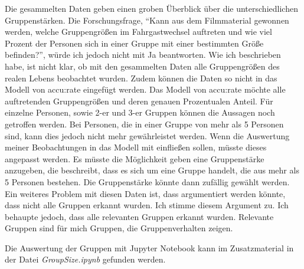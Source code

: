 Die gesammelten Daten geben einen groben Überblick über die unterschiedlichen Gruppenstärken. Die Forschungsfrage, "`Kann aus dem Filmmaterial gewonnen werden, welche Gruppengrößen im Fahrgastwechsel auftreten und wie viel Prozent der Personen sich in einer Gruppe mit einer bestimmten Größe befinden?"', würde ich jedoch nicht mit Ja beantworten. Wie ich beschrieben habe, ist nicht klar, ob mit den gesammelten Daten alle Gruppengrößen des realen Lebens beobachtet wurden. Zudem können die Daten so nicht in das Modell von accu:rate eingefügt werden. Das Modell von accu:rate möchte alle auftretenden Gruppengrößen und deren genauen Prozentualen Anteil. Für einzelne Personen, sowie 2-er und 3-er Gruppen können die Aussagen noch getroffen werden. Bei Personen, die in einer Gruppe von mehr als 5 Personen sind, kann dies jedoch nicht mehr gewährleistet werden. Wenn die Auswertung meiner Beobachtungen in das Modell mit einfließen sollen, müsste dieses angepasst werden. Es müsste die Möglichkeit geben eine Gruppenstärke anzugeben, die beschreibt, dass es sich um eine Gruppe handelt, die aus mehr als 5 Personen bestehen. Die Gruppenstärke könnte dann zufällig gewählt werden. Ein weiteres Problem mit diesen Daten ist, dass argumentiert werden könnte, dass nicht alle Gruppen erkannt wurden. Ich stimme diesem Argument zu. Ich behaupte jedoch, dass alle relevanten Gruppen erkannt wurden. Relevante Gruppen sind für mich Gruppen, die Gruppenverhalten zeigen.

Die Auswertung der Gruppen mit \textsf{Jupyter Notebook} kann im Zusatzmaterial in der Datei \textsl{GroupSize.ipynb} gefunden werden.
